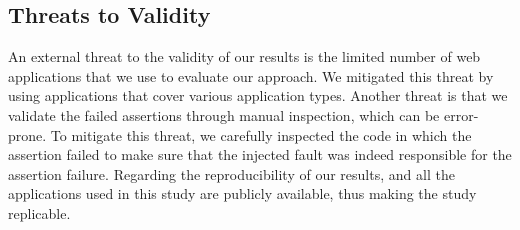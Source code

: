 \subsection{Threats to Validity} \label{threatsToValidity}

An external threat to the validity of our results is the limited number of web applications that we use to evaluate our approach. 
We mitigated this threat by using \javascript applications that cover various application types.
Another threat is that we validate the failed assertions through manual inspection,  which can be error-prone. To mitigate this threat, we carefully inspected the code in which the assertion failed to make sure that the injected fault was indeed responsible for the assertion failure. %
Regarding the reproducibility of our results, \jseft and all the applications used in this study are publicly available, thus making the study replicable.
